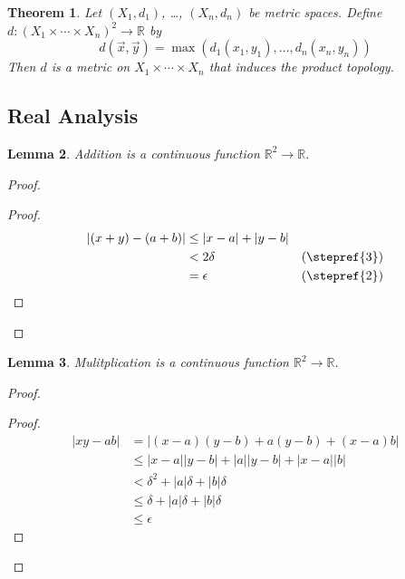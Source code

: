 \documentclass{book}
\newtheorem{lm}{Lemma}[chapter]
\newtheorem{thm}[lm]{Theorem}
\theoremstyle{definition}
\begin{document}
  \begin{thm}
    Let $(X_1, d_1)$, \ldots, $(X_n, d_n)$ be metric spaces. Define $d : (X_1 
    \times \cdots \times X_n)^2 \rightarrow \mathbb{R}$ by
    \[ d(\vec{x}, \vec{y}) = \max(d_1(x_1, y_1), \ldots, d_n(x_n, y_n)) \]
    Then $d$ is a metric on $X_1 \times \cdots \times X_n$ that induces the 
    product topology.
  \end{thm}
  
  \subsection{Real Analysis}
  
  \begin{lm}
    Addition is a continuous function $\mathbb{R}^2 \rightarrow \mathbb{R}$.
  \end{lm}
  
  \begin{proof}
    \begin{proof}
      \pf
      \begin{align*}
        |(x + y) - (a + b)| & \leq | x - a | + | y - b | \\
        & < 2 \delta & (\text{\stepref{3}}) \\
        & = \epsilon & (\text{\stepref{2}})
      \end{align*}
    \end{proof}
  \end{proof}
  
  \begin{lm}
    Mulitplication is a continuous function $\mathbb{R}^2 \rightarrow 
    \mathbb{R}$.
  \end{lm}
  
  \begin{proof}
    \begin{proof}
      \pf
      \begin{align*}
        |xy - ab| & = |(x-a)(y-b) + a(y-b) + (x-a)b| \\
        & \leq |x-a||y-b| + |a||y-b| + |x-a||b| \\
        & < \delta^2 + |a| \delta + |b| \delta \\
        & \leq \delta + |a| \delta + |b| \delta \\
        & \leq \epsilon
      \end{align*}
    \end{proof}
  \end{proof}
  
\end{document}
